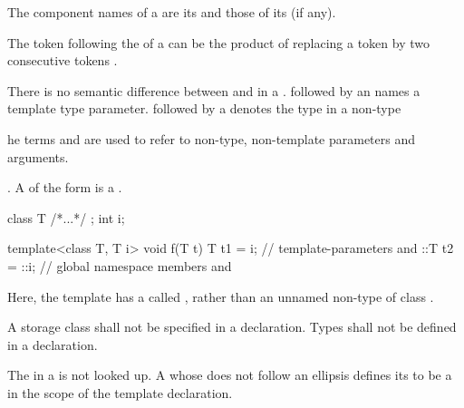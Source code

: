 \documentclass{wg21}
\begin{document}
%
The component names of a  are
its  and
those of its  (if any).
\begin{note}
    The \tcode{>} token following the
     of a
    can be the product of replacing a
    \tcode{>>} token by two consecutive \tcode{>}
    tokens .
\end{note}

\pnum
There is no semantic difference between
and
in a
.
followed by an
names a template type parameter.
followed by a
denotes the type in a non-type
\begin{wfootnote}
    he terms
    and
    are used to refer to non-type, non-template parameters and arguments.
\end{wfootnote} .
A  of the form
  is a .
\begin{example}
    \begin{codeblock}
        class T { /*...*/ };
        int i;

        template<class T, T i> void f(T t) {
            T t1 = i;         // template-parameters  and 
            ::T t2 = ::i;     // global namespace members  and 
        }
    \end{codeblock}
    Here, the template  has a 
    called , rather than an unnamed non-type
     of class .
\end{example}
A storage class shall not be specified in a
declaration.
Types shall not be defined in a 
declaration.

\pnum
The  in a  is not looked up.
A 
whose  does not follow an ellipsis
defines its
to be a
in the scope of the template declaration.
\end{document}
